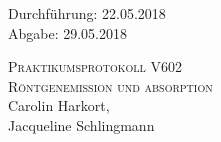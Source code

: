 

\begin{titlepage}
  \begin{flushleft}
 Durchführung: 22.05.2018\\
 Abgabe: 29.05.2018
  \end{flushleft}



 \begin{center}


\textsc{\LARGE Praktikumsprotokoll V602}\\[1.5cm]
\textsc{\huge Röntgenemission und absorption} \\[5,5cm]

Carolin Harkort\footnotemark[1], \\
Jacqueline Schlingmann\footnotemark[2] \\[1,0cm]



 \end{center}

 \vfill

\end{titlepage}


  
  

\nocite{*}
\printbibliography

